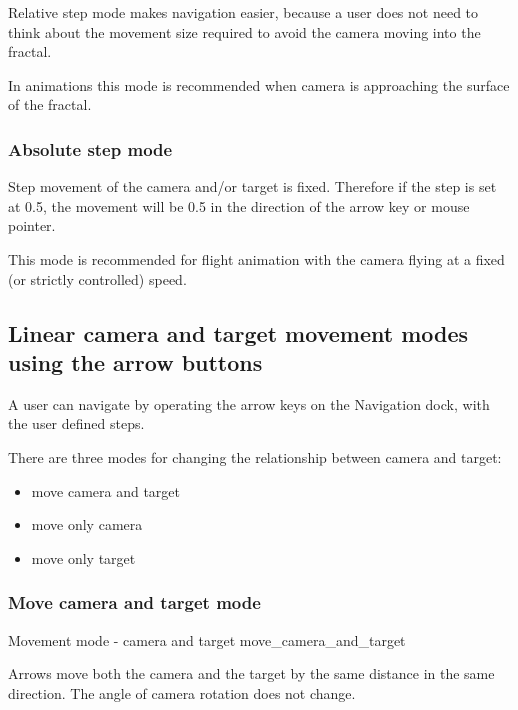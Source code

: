 Relative step mode makes navigation easier, because a user does not need to think about the movement size required to avoid
the camera moving into the fractal.

In animations this mode is recommended when camera is approaching the surface of
the fractal.

\subsubsection{Absolute step mode}\label{absolute-step-mode}

Step movement of the camera and/or target is fixed. Therefore if the step is set
at 0.5, the movement will be 0.5 in the direction of the arrow key or mouse
pointer.

This mode is recommended for flight animation with the camera flying at a fixed (or strictly
controlled) speed.

\subsection{Linear camera and target movement modes using the arrow
	buttons}\label{linear-camera-and-target-movement-modes-using-the-arrow-buttons}

A user can navigate by operating the arrow keys on the Navigation dock, with the
user defined steps.

There are three modes for changing the relationship between camera and target:

\begin{multicols}{3}
\begin{itemize}
	\item move camera and target
	\item move only camera
	\item move only target
\end{itemize}
\end{multicols}

\subsubsection{Move camera and target mode}\label{move-camera-and-target-mode}

{Movement mode - camera and target}
{move_camera_and_target}

Arrows move both the camera and the target by the same distance in the same direction. The angle of camera rotation does not change.

